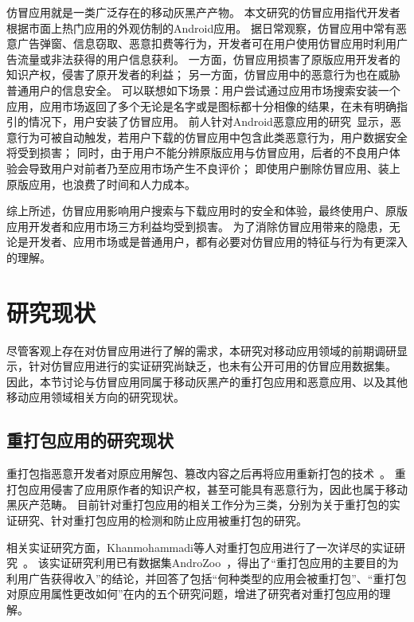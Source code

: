 仿冒应用就是一类广泛存在的移动灰黑产产物。
本文研究的仿冒应用指代开发者根据市面上热门应用的外观仿制的Android应用。
据日常观察，仿冒应用中常有恶意广告弹窗、信息窃取、恶意扣费等行为，开发者可在用户使用仿冒应用时利用广告流量或非法获得的用户信息获利。
一方面，仿冒应用损害了原版应用开发者的知识产权，侵害了原开发者的利益；
另一方面，仿冒应用中的恶意行为也在威胁普通用户的信息安全。
可以联想如下场景：用户尝试通过应用市场搜索安装一个应用，应用市场返回了多个无论是名字或是图标都十分相像的结果，在未有明确指引的情况下，用户安装了仿冒应用。
前人针对Android恶意应用的研究~\cite{Zhou2012DissectingAM}显示，恶意行为可被自动触发，若用户下载的仿冒应用中包含此类恶意行为，用户数据安全将受到损害；
同时，由于用户不能分辨原版应用与仿冒应用，后者的不良用户体验会导致用户对前者乃至应用市场产生不良评价；
即使用户删除仿冒应用、装上原版应用，也浪费了时间和人力成本。

综上所述，仿冒应用影响用户搜索与下载应用时的安全和体验，最终使用户、原版应用开发者和应用市场三方利益均受到损害。
为了消除仿冒应用带来的隐患，无论是开发者、应用市场或是普通用户，都有必要对仿冒应用的特征与行为有更深入的理解。

\section{研究现状}
尽管客观上存在对仿冒应用进行了解的需求，本研究对移动应用领域的前期调研显示，针对仿冒应用进行的实证研究尚缺乏，也未有公开可用的仿冒应用数据集。
因此，本节讨论与仿冒应用同属于移动灰黑产的重打包应用和恶意应用、以及其他移动应用领域相关方向的研究现状。

\subsection{重打包应用的研究现状}
\label{sec:study_repackaging}
重打包指恶意开发者对原应用解包、篡改内容之后再将应用重新打包的技术~\cite{khanmohammadi2019empirical}。
重打包应用侵害了应用原作者的知识产权，甚至可能具有恶意行为，因此也属于移动黑灰产范畴。
目前针对重打包应用的相关工作分为三类，分别为关于重打包的实证研究、针对重打包应用的检测和防止应用被重打包的研究。

相关实证研究方面，Khanmohammadi等人对重打包应用进行了一次详尽的实证研究~\cite{khanmohammadi2019empirical}。
该实证研究利用已有数据集AndroZoo~\cite{li2017androzoo++}，得出了``重打包应用的主要目的为利用广告获得收入''的结论，并回答了包括``何种类型的应用会被重打包''、``重打包对原应用属性更改如何''在内的五个研究问题，增进了研究者对重打包应用的理解。



